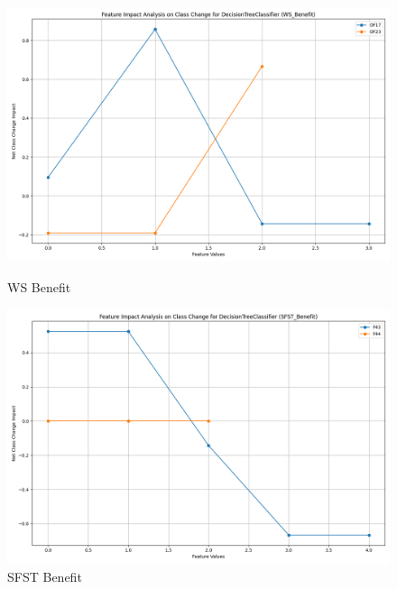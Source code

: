 \begin{figure}[H]
    \centering
    \begin{minipage}{0.495\textwidth}
        \centering
        \includegraphics[width=\linewidth]{analysis/images/feature_impact_class_change_WS_Benefit_DecisionTreeClassifier.png}
        \caption{WS Benefit}
        \label{fig:ws_ben_class_analysis}
    \end{minipage}\hfill
    \begin{minipage}{0.495\textwidth}
        \centering
        \includegraphics[width=\linewidth]{analysis/images/feature_impact_class_change_SFST_Benefit_DecisionTreeClassifier.png}
        \caption{SFST Benefit}
        \label{fig:sfst_ben_class_analysis}
    \end{minipage}
\end{figure}